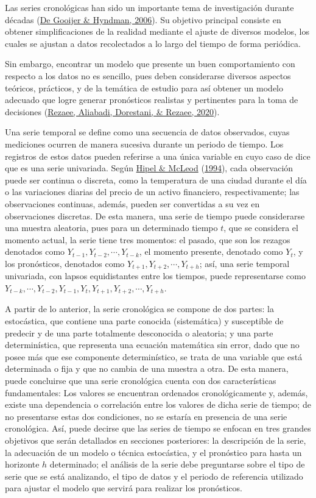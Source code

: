 \documentclass[
]{article}
\begin{document}
Las series cronológicas han sido un importante tema de investigación
durante décadas (\protect\hyperlink{ref-tsa_decades}{De Gooijer \&
Hyndman, 2006}). Su objetivo principal consiste en obtener
simplificaciones de la realidad mediante el ajuste de diversos modelos,
los cuales se ajustan a datos recolectados a lo largo del tiempo de
forma periódica.

Sin embargo, encontrar un modelo que presente un buen comportamiento con
respecto a los datos no es sencillo, pues deben considerarse diversos
aspectos teóricos, prácticos, y de la temática de estudio para así
obtener un modelo adecuado que logre generar pronósticos realistas y
pertinentes para la toma de decisiones
(\protect\hyperlink{ref-tsa_decision_making}{Rezaee, Aliabadi,
Dorestani, \& Rezaee, 2020}).

Una serie temporal se define como una secuencia de datos observados,
cuyas mediciones ocurren de manera sucesiva durante un periodo de
tiempo. Los registros de estos datos pueden referirse a una única
variable en cuyo caso de dice que es una serie univariada. Según
\protect\hyperlink{ref-Hipel}{Hipel \& McLeod}
(\protect\hyperlink{ref-Hipel}{1994}), cada observación puede ser
continua o discreta, como la temperatura de una ciudad durante el día o
las variaciones diarias del precio de un activo financiero,
respectivamente; las observaciones continuas, además, pueden ser
convertidas a su vez en observaciones discretas. De esta manera, una
serie de tiempo puede considerarse una muestra aleatoria, pues para un
determinado tiempo \(t\), que se considera el momento actual, la serie
tiene tres momentos: el pasado, que son los rezagos denotados como
\(Y_{t-1}, Y_{t-2}, \cdots, Y_{t-k}\), el momento presente, denotado
como \(Y_t\), y los pronósticos, denotados como
\(Y_{t+1}, Y_{t+2}, \cdots, Y_{t+h}\); así, una serie temporal
univariada, con lapsos equidistantes entre los tiempos, puede
representarse como
\(Y_{t-k}, \cdots, Y_{t-2}, Y_{t-1}, Y_t, Y_{t+1}, Y_{t+2}, \cdots, Y_{t+h}\).

A partir de lo anterior, la serie cronológica se compone de dos partes:
la estocástica, que contiene una parte conocida (sistemática) y
susceptible de predecir y de una parte totalmente desconocida o
aleatoria; y una parte determinística, que representa una ecuación
matemática sin error, dado que no posee más que ese componente
determinístico, se trata de una variable que está determinada o fija y
que no cambia de una muestra a otra. De esta manera, puede concluirse
que una serie cronológica cuenta con dos características fundamentales:
Los valores se encuentran ordenados cronológicamente y, además, existe
una dependencia o correlación entre los valores de dicha serie de
tiempo; de no presentarse estas dos condiciones, no se estaría en
presencia de una serie cronológica. Así, puede decirse que las series de
tiempo se enfocan en tres grandes objetivos que serán detallados en
secciones posteriores: la descripción de la serie, la adecuación de un
modelo o técnica estocástica, y el pronóstico para hasta un horizonte
\(h\) determinado; el análisis de la serie debe preguntarse sobre el
tipo de serie que se está analizando, el tipo de datos y el periodo de
referencia utilizado para ajustar el modelo que servirá para realizar
los pronósticos.
\end{document}
